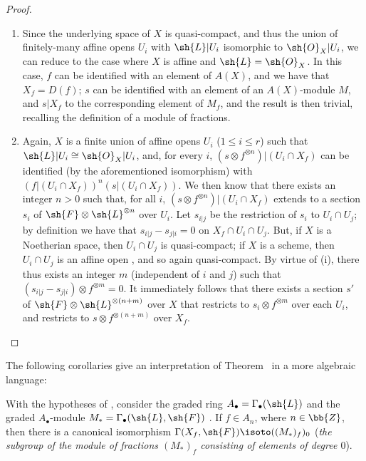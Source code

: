 \begin{proof}
\medskip\noindent
\begin{enumerate}
  \item[(i)] Since the underlying space of $X$ is quasi-compact, and thus the union of
    finitely-many affine opens $U_i$ with $\sh{L}|U_i$ isomorphic to
    $\sh{O}_X|U_i$, we can reduce to the case where $X$ is affine and $\sh{L}=\sh{O}_X$.
    In this case, $f$ can be identified with an element of $A(X)$, and we have that
    $X_f=D(f)$; $s$ can be identified with an element of an $A(X)$-module $M$, and
    $s|X_f$ to the corresponding element of $M_f$, and the result is then trivial,
    recalling the definition of a module of fractions.
  \item[(ii)] Again, $X$ is a finite union of affine opens $U_i$ ($1\leq i\leq r$)
    such that $\sh{L}|U_i\cong\sh{O}_X|U_i$, and, for every $i$,
    $(s\otimes f^{\otimes n})|(U_i\cap X_f)$ can be identified (by the aforementioned
    isomorphism) with $(f|(U_i\cap X_f))^n(s|(U_i\cap X_f))$. We then know
     that there exists an integer $n>0$ such that, for all
    $i$, $(s\otimes f^{\otimes n})|(U_i\cap X_f)$ extends to a section $s_i$ of
    $\sh{F}\otimes\sh{L}^{\otimes n}$ over $U_i$. Let $s_{i|j}$ be the restriction
    of $s_i$ to $U_i\cap U_j$; by definition we have that $s_{i|j}-s_{j|i}=0$ on
    $X_f\cap U_i\cap U_j$. But, if $X$ is a Noetherian space, then $U_i\cap U_j$ is
    quasi-compact; if $X$ is a scheme, then $U_i\cap U_j$ is an affine open
    , and so again quasi-compact. By virtue of (i), there thus
    exists an integer $m$ (independent of $i$ and $j$) such that
    $(s_{i|j}-s_{j|i})\otimes f^{\otimes m}=0$. It immediately follows that there
    exists a section $s'$ of $\sh{F}\otimes\sh{L}^{\otimes(n+m)}$ over $X$ that
    restricts to $s_i\otimes f^{\otimes m}$ over each $U_i$, and restricts to
    $s\otimes f^{\otimes(n+m)}$ over $X_f$.
\end{enumerate}
\end{proof}

The following corollaries give an interpretation of Theorem~ in a more
algebraic language:
\begin{corollary}[9.3.2]
\label{I.9.3.2}
With the hypotheses of , consider the graded ring $A_\bullet=\Gamma_\bullet(\sh{L})$
and the graded $A_\bullet$-module $M_*=\Gamma_\bullet(\sh{L},\sh{F})$ . If $f\in A_n$,
where $n\in\bb{Z}$, then there is a canonical isomorphism
$\Gamma(X_f,\sh{F})\isoto((M_*)_f)_0$ (\emph{the subgroup of the module of
fractions $(M_*)_f$ consisting of elements of degree $0$}).
\end{corollary}


